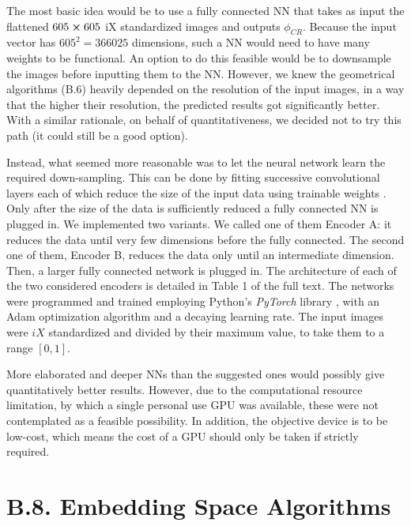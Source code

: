 \documentclass[11pt, a4paper, twoside]{article} %
\begin{document}
The most basic idea would be to use a fully connected NN \cite{NN} that takes as input the flattened $605\cross 605$ iX standardized images and outputs $\phi_{CR}$. Because the input vector has $605^2=366025$ dimensions, such a NN would need to have many weights to be functional. An option to do this feasible would be to downsample the images before inputting them to the NN. However, we knew the geometrical algorithms (B.6) heavily depended on the resolution of the input images, in a way that the higher their resolution, the predicted results got significantly better. With a similar rationale, on behalf of quantitativeness, we decided not to try this path (it could still be a good option).%

Instead, what seemed more reasonable was to let the neural network learn the required down-sampling. This can be done by fitting successive convolutional layers each of which reduce the size of the input data using trainable weights \cite{NN}. Only after the size of the data is sufficiently reduced a fully connected NN is plugged in. We implemented two variants. We called one of them Encoder A: it reduces the data until very few dimensions before the fully connected. The second one of them, Encoder B, reduces the data only until an intermediate dimension. Then, a larger fully connected network is plugged in. The architecture of each of the two considered encoders is detailed in Table 1 of the full text. The networks were programmed and trained employing Python's {\em PyTorch} library \cite{pytorch}, with an Adam optimization algorithm \cite{adam} and a decaying learning rate. The input images were $iX$ standardized and divided by their maximum value, to take them to a range $[0,1]$.%

More elaborated and deeper NNs than the suggested ones would possibly give quantitatively better results. However, due to the computational resource limitation, by which a single personal use GPU was available, these were not contemplated as a feasible possibility. In addition, the objective device is to be low-cost, which means the cost of a GPU should only be taken if strictly required.\vspace{-0.3cm}


\section*{B.8. Embedding Space Algorithms}\vspace{-0.2cm}
\end{document}
